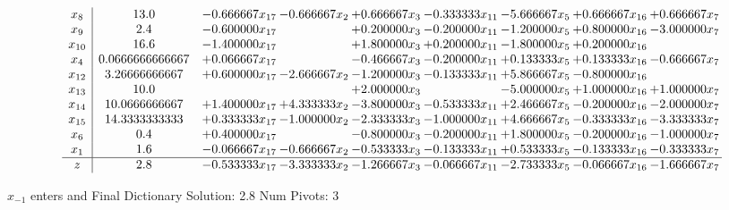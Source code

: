\documentclass[10pt]{article}
\begin{document}
 \[\begin{array}{c| c c@{\hskip 2pt} c@{\hskip 2pt} c@{\hskip 2pt} c@{\hskip 2pt} c@{\hskip 2pt} c@{\hskip 2pt} c@{\hskip 2pt} }
 x_{8}   &  13.0 & -0.666667 x_{17} & -0.666667 x_{2} & + 0.666667 x_{3} & -0.333333 x_{11} & -5.666667 x_{5} & + 0.666667 x_{16} & + 0.666667 x_{7}\\
 x_{9}   &  2.4 & -0.600000 x_{17} &   & + 0.200000 x_{3} & -0.200000 x_{11} & -1.200000 x_{5} & + 0.800000 x_{16} & -3.000000 x_{7}\\
 x_{10}   &  16.6 & -1.400000 x_{17} &   & + 1.800000 x_{3} & + 0.200000 x_{11} & -1.800000 x_{5} & + 0.200000 x_{16} &   \\
 x_{4}   &  0.0666666666667 & + 0.066667 x_{17} &   & -0.466667 x_{3} & -0.200000 x_{11} & + 0.133333 x_{5} & + 0.133333 x_{16} & -0.666667 x_{7}\\
 x_{12}   &  3.26666666667 & + 0.600000 x_{17} & -2.666667 x_{2} & -1.200000 x_{3} & -0.133333 x_{11} & + 5.866667 x_{5} & -0.800000 x_{16} &   \\
 x_{13}   &  10.0  &    &   & + 2.000000 x_{3} &   & -5.000000 x_{5} & + 1.000000 x_{16} & + 1.000000 x_{7}\\
 x_{14}   &  10.0666666667 & + 1.400000 x_{17} & + 4.333333 x_{2} & -3.800000 x_{3} & -0.533333 x_{11} & + 2.466667 x_{5} & -0.200000 x_{16} & -2.000000 x_{7}\\
 x_{15}   &  14.3333333333 & + 0.333333 x_{17} & -1.000000 x_{2} & -2.333333 x_{3} & -1.000000 x_{11} & + 4.666667 x_{5} & -0.333333 x_{16} & -3.333333 x_{7}\\
 x_{6}   &  0.4 & + 0.400000 x_{17} &   & -0.800000 x_{3} & -0.200000 x_{11} & + 1.800000 x_{5} & -0.200000 x_{16} & -1.000000 x_{7}\\
 x_{1}   &  1.6 & -0.066667 x_{17} & -0.666667 x_{2} & -0.533333 x_{3} & -0.133333 x_{11} & + 0.533333 x_{5} & -0.133333 x_{16} & -0.333333 x_{7}\\
\hline
z    &  2.8 & -0.533333 x_{17} & -3.333333 x_{2} & -1.266667 x_{3} & -0.066667 x_{11} & -2.733333 x_{5} & -0.066667 x_{16} & -1.666667 x_{7}\\
\end{array}\]


 $ x_{-1} $ enters and Final Dictionary
Solution:  2.8
Num Pivots:  3
\end{document}
